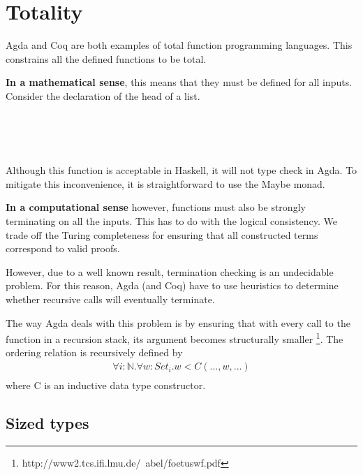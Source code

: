 \documentclass[12pt,twoside,notitlepage]{report}
\begin{document}
\section{Totality}

Agda and Coq are both examples of total function programming languages. This constrains all the defined functions to be total. 


\textbf{In a mathematical sense}, this means that they must be defined for all inputs. Consider the declaration of the head of a list.

\begin{code}
\\
\> \AgdaSymbol{:}  \AgdaSymbol{\{}\AgdaSymbol{\}}     \<%
\\
\> \AgdaSymbol{(}  \AgdaSymbol{)} \AgdaSymbol{=} \<%
\\
\end{code}

Although this function is acceptable in Haskell, it will not type check in Agda. To mitigate this inconvenience, it is straightforward to use the Maybe monad.

\textbf{In a computational sense} however, functions must also be strongly terminating on all the inputs. This has to do with the logical consistency. We trade off the Turing completeness for ensuring that all constructed terms correspond to valid proofs.

However, due to a well known result, termination checking is an undecidable problem. For this reason, Agda (and Coq) have to use heuristics to determine whether recursive calls will eventually terminate.

The way Agda deals with this problem is by ensuring that with every call to the function in a recursion stack, its argument becomes structurally smaller \cite{str_smaller} \footnote{http://www2.tcs.ifi.lmu.de/~abel/foetuswf.pdf}. The ordering relation is recursively defined by \begin{align*}
\forall i : \mathbb{N}.\forall w : Set_i. w < C(...,w,...)\\
\end{align*}
where C is an inductive data type constructor.

\subsection{Sized types}
\end{document}
